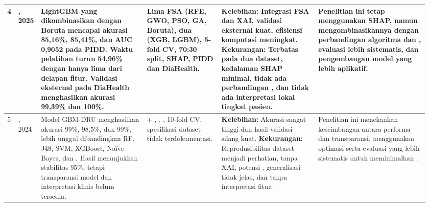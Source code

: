 \begin{landscape}
\begin{longtable}{|C{0.7cm}|L{2.9cm}|L{5.4cm}|L{3.0cm}|L{4.4cm}|L{3.7cm}|}
4 & , 2025 \cite{ref27} & LightGBM yang dikombinasikan dengan Boruta mencapai akurasi 85,16\%,  85,41\%, dan AUC 0,9052 pada PIDD. Waktu pelatihan turun 54,96\% dengan hanya lima dari delapan fitur. Validasi eksternal pada DiaHealth menghasilkan akurasi 99,39\% dan  100\%. & Lima FSA (RFE, GWO, PSO, GA, Boruta), dua  (XGB, LGBM), 5-fold CV, 70:30 split, SHAP, PIDD dan DiaHealth. & \textbf{Kelebihan:} Integrasi FSA dan XAI, validasi eksternal kuat, efisiensi komputasi meningkat. \newline\textbf{Kekurangan:} Terbatas pada dua dataset, kedalaman SHAP minimal, tidak ada perbandingan , dan tidak ada interpretasi lokal tingkat pasien. & Penelitian ini tetap menggunakan SHAP, namun mengombinasikannya dengan perbandingan algoritma  dan , evaluasi lebih sistematis, dan pengembangan model yang lebih aplikatif.\\ \hline

5 & , 2024 \cite{ref28} & Model GBM-DRU menghasilkan akurasi 99\%,  98,5\%, dan  99\%, lebih unggul dibandingkan RF, J48, SVM, XGBoost, Naïve Bayes, dan . Hasil  menunjukkan stabilitas 95\%, tetapi transparansi model dan interpretasi klinis belum tersedia. &  + , , , 10-fold CV, spesifikasi dataset tidak terdokumentasi. & \textbf{Kelebihan:} Akurasi sangat tinggi dan hasil validasi silang kuat. \newline\textbf{Kekurangan:} Reprodusibilitas dataset menjadi perhatian, tanpa XAI, potensi , generalisasi tidak jelas, dan tanpa interpretasi fitur. & Penelitian ini menekankan keseimbangan antara performa dan transparansi, menggunakan optimasi  serta evaluasi yang lebih sistematis untuk meminimalkan .\\ \hline


\end{longtable}
\end{landscape}

